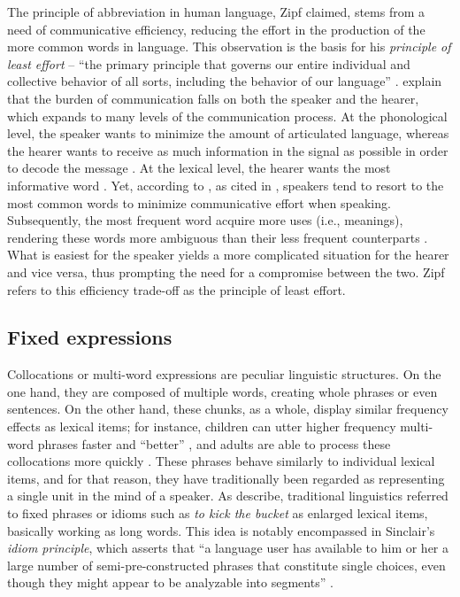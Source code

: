 \documentclass[output=paper,colorlinks,citecolor=brown,draftmode]{langscibook}
\begin{document}
The principle of abbreviation in human language, Zipf claimed, stems from a need of communicative efficiency, reducing the effort in the production of the more common words in language. This observation is the basis for his \emph{principle of least effort} -- ``the primary principle that governs our entire individual and collective behavior of all sorts, including the behavior of our language'' \citep[``Preface,'' paragraph 22]{zipf1949human}. \citeauthor{ferrer2013failure} explain that the burden of communication falls on both the speaker and the hearer, which expands to many levels of the communication process. At the phonological level, the speaker wants to minimize the amount of articulated language, whereas the hearer wants to receive as much information in the signal as possible in order to decode the message \citep{pinker1990natural,kohler1986linguistischen}. At the lexical level, the hearer wants the most informative word \citep{kohler1986linguistischen,zipf1949human}. Yet, according to \citet{kohler1986linguistischen}, as cited in \citet{ferrer2003least}, speakers tend to resort to the most common words to minimize communicative effort when speaking. Subsequently, the most frequent word acquire more uses (i.e., meanings), rendering these words more ambiguous than their less frequent counterparts \citep[788]{ferrer2013failure}. What is easiest for the speaker yields a more complicated situation for the hearer and vice versa, thus prompting the need for a compromise between the two. Zipf refers to this efficiency trade-off as the principle of least effort.

\subsection{Fixed expressions}

Collocations or multi-word expressions are peculiar linguistic structures. On the one hand, they are composed of multiple words, creating whole phrases or even sentences. On the other hand, these chunks, as a whole, display similar frequency effects as lexical items; for instance, children can utter higher frequency multi-word phrases faster and ``better'' \citep{bannard2008stored}, and adults are able to process these collocations more quickly \citep{arnon2010more}. These phrases behave similarly to individual lexical items, and for that reason, they have traditionally been regarded as representing a single unit in the mind of a speaker. As \citet{erker2012role} describe, traditional linguistics referred to fixed phrases or idioms such as \emph{to kick the bucket} as enlarged lexical items, basically working as long words. This idea is notably encompassed in Sinclair's \emph{idiom principle}, which asserts that ``a language user has available to him or her a large number of semi-pre-constructed phrases that constitute single choices, even though they might appear to be analyzable into segments'' \citep[110]{sinclair1991corpus}.
\end{document}
